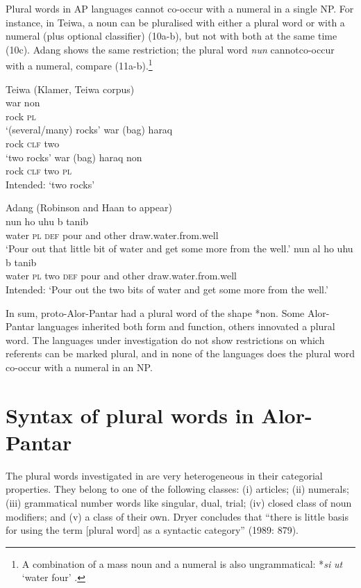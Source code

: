 Plural words in AP languages cannot co-occur with a numeral in a single NP. For instance, in Teiwa, a noun can be pluralised with either a plural word or with a numeral (plus optional classifier) (10a-b), but not with both at the same time (10c). Adang shows the same restriction; the plural word \textit{nun} cannotco-occur with a numeral, compare (11a-b).\footnote{  A combination of a mass noun and a numeral is also ungrammatical: *\textit{s}\textit{{\textepsilon}}\textit{i} \textit{ut} `water four' \citep[296]{Haan2001}.}


\ea%
\label{ex:10}
Teiwa (Klamer, Teiwa corpus)\\
\ea
\gll  war non\\
   rock \textsc{pl}  \\
\glt `(several/many) rocks'
\ex
\gll war (bag) {haraq}\\
 rock \textsc{clf} two  \\
\glt   `two rocks'
\ex
\gll *war (bag) haraq non \\
 rock \textsc{clf} two \textsc{pl} \\
 \glt Intended: `two rocks'
\z
\z



\ea%
\label{ex:11}
Adang (Robinson and Haan to appear)\\
\ea
{} nun ho {{\textglotstop}}{uhu}{{\textltailn} {\textepsilon}} {b}{{\textepsilon}}{\ng} tanib \\
   water \textsc{pl} \textsc{def} pour and other draw.water.from.well  \\
\glt `Pour out that little bit of water and get some more from the well.'
\ex
{} nun {al}{{\textopeno}} ho {\textglotstop}{uhu}{\textltailn} {\textepsilon} {b}{{\textepsilon}}{\ng} tanib \\
   water \textsc{pl} two \textsc{def} pour and other draw.water.from.well  \\
\glt  Intended: `Pour out the two bits of water and get some more from the well.'
\z
\z

In sum, proto-Alor-Pantar had a plural word of the shape *non. Some Alor-Pantar languages inherited both form and function, others innovated a plural word. The languages under investigation do not show restrictions on which referents can be marked plural, and in none of the languages does the plural word co-occur with a numeral in an NP.

\section{Syntax of plural words in Alor-Pantar}  %
The plural words investigated in \citet{Dryer1989} are very heterogeneous in their categorial properties. They belong to one of the following classes: (i) articles; (ii) numerals; (iii) grammatical number words like singular, dual, trial; (iv) closed class of noun modifiers; and (v) a class of their own. Dryer concludes that ``there is little basis for using the term [plural word] as a syntactic category'' (1989: 879).

